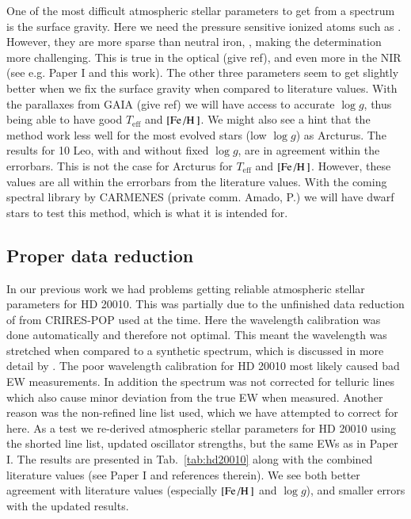 \documentclass{aa}
\begin{document}
One of the most difficult atmospheric stellar parameters to get from a spectrum
is the surface gravity. Here we need the pressure sensitive ionized atoms such
as . However, they are more sparse than neutral iron, ,
making the determination more challenging. This is true in the optical (give
ref), and even more in the NIR (see e.g. Paper I and this work). The other three
parameters seem to get slightly better when we fix the surface gravity when
compared to literature values. With the parallaxes from GAIA (give ref) we will
have access to accurate $\log g$, thus being able to have good $T_\mathrm{eff}$
and $[\ion{Fe}/\ion{H}]$. We might also see a hint that the method work less
well for the most evolved stars (low $\log g$) as Arcturus. The results for 10
Leo, with and without fixed $\log g$, are in agreement within the errorbars.
This is not the case for Arcturus for $T_\mathrm{eff}$ and $[\ion{Fe}/\ion{H}]$.
However, these values are all within the errorbars from the literature values.
With the coming spectral library by CARMENES (private comm. Amado, P.) we will
have dwarf stars to test this method, which is what it is intended for.


\subsection{Proper data reduction}

In our previous work we had problems getting reliable atmospheric stellar
parameters for HD 20010. This was partially due to the unfinished data reduction
of from CRIRES-POP used at the time. Here the wavelength calibration was done
automatically and therefore not optimal. This meant the wavelength was stretched
when compared to a synthetic spectrum, which is discussed in more detail by
\citet{Nicholls2016}. The poor wavelength calibration for HD 20010 most likely
caused bad EW measurements. In addition the spectrum was not corrected for
telluric lines which also cause minor deviation from the true EW when measured.
Another reason was the non-refined line list used, which we have attempted to
correct for here. As a test we re-derived atmospheric stellar parameters for HD
20010 using the shorted line list, updated oscillator strengths, but the same
EWs as in Paper I. The results are presented in Tab.~\ref{tab:hd20010} along
with the combined literature values (see Paper I and references therein). We see
both better agreement with literature values (especially $[\ion{Fe}/\ion{H}]$
and $\log g$), and smaller errors with the updated results.
\end{document}
